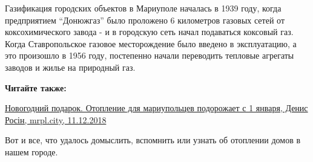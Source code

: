 Газификация городских объектов в Мариуполе началась в 1939 году, когда
предприятием \enquote{Донюжгаз} было проложено 6 километров газовых сетей от
коксохимического завода - и в городскую сеть начал подаваться коксовый газ.
Когда Ставропольское газовое месторождение было введено в эксплуатацию, а это
произошло в 1956 году, постепенно начали переводить тепловые агрегаты заводов и
жилье на природный газ.

\textbf{Читайте также:} 

\href{https://mrpl.city/news/view/novogodnij-podarok-otoplenie-dlya-mariupoltsev-podorozhaet-s-1-yanvarya}{%
Новогодний подарок. Отопление для мариупольцев подорожает с 1 января, Денис Росін, mrpl.city, 11.12.2018}

Вот и все, что удалось домыслить, вспомнить или узнать об отоплении домов в нашем городе.
